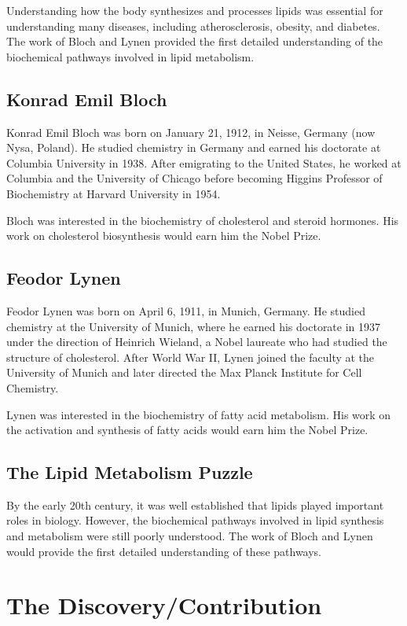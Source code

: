 Understanding how the body synthesizes and processes lipids was essential for understanding many diseases, including atherosclerosis, obesity, and diabetes. The work of Bloch and Lynen provided the first detailed understanding of the biochemical pathways involved in lipid metabolism.

\subsection{Konrad Emil Bloch}

Konrad Emil Bloch was born on January 21, 1912, in Neisse, Germany (now Nysa, Poland). He studied chemistry in Germany and earned his doctorate at Columbia University in 1938. After emigrating to the United States, he worked at Columbia and the University of Chicago before becoming Higgins Professor of Biochemistry at Harvard University in 1954.

Bloch was interested in the biochemistry of cholesterol and steroid hormones. His work on cholesterol biosynthesis would earn him the Nobel Prize.

\subsection{Feodor Lynen}

Feodor Lynen was born on April 6, 1911, in Munich, Germany. He studied chemistry at the University of Munich, where he earned his doctorate in 1937 under the direction of Heinrich Wieland, a Nobel laureate who had studied the structure of cholesterol. After World War II, Lynen joined the faculty at the University of Munich and later directed the Max Planck Institute for Cell Chemistry.

Lynen was interested in the biochemistry of fatty acid metabolism. His work on the activation and synthesis of fatty acids would earn him the Nobel Prize.

\subsection{The Lipid Metabolism Puzzle}

By the early 20th century, it was well established that lipids played important roles in biology. However, the biochemical pathways involved in lipid synthesis and metabolism were still poorly understood. The work of Bloch and Lynen would provide the first detailed understanding of these pathways.

\section{The Discovery/Contribution}

